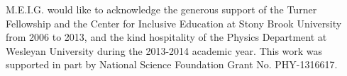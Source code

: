 M.E.I.G. would like to acknowledge the generous support of the Turner Fellowship and the Center for Inclusive Education at Stony Brook University from 2006 to 2013, and the kind hospitality of the Physics Department at Wesleyan University during the 2013-2014 academic year. This work was supported in part by National Science Foundation Grant No. PHY-1316617.